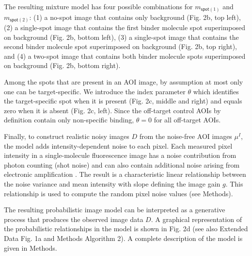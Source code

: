 The resulting mixture model has four possible combinations for $m_{\mathsf{spot}(1)}$ and $m_{\mathsf{spot}(2)}$: (1) a no-spot image that contains only background (Fig. 2b, top left), (2) a single-spot image that contains the first binder molecule spot superimposed on background (Fig. 2b, bottom left), (3) a single-spot image that contains the second binder molecule spot superimposed on background (Fig. 2b, top right), and (4) a two-spot image that contains both binder molecule spots superimposed on background (Fig. 2b, bottom right).

Among the spots that are present in an AOI image, by assumption at most only one can be target-specific. We introduce the index parameter $\theta$ which identifies the target-specific spot  when it is present (Fig. 2c, middle and right) and equals zero when it is absent (Fig. 2c, left). Since the off-target control AOIs by definition contain only non-specific binding, $\theta = 0$ for all off-target AOIs. 

Finally, to construct realistic noisy images $D$ from the noise-free AOI images $\mu^I$, the model adds intensity-dependent noise to each pixel.  Each measured pixel intensity in a single-molecule fluorescence image has a noise contribution from photon counting (shot noise) and can also contain additional noise arising from electronic amplification \cite{Van_Vliet1998-jk}. The result is a characteristic linear relationship between the noise variance and mean intensity with slope defining the image gain $g$. This relationship is used to compute the random pixel noise values (see Methods).

The resulting probabilistic image model can be interpreted as a generative process that produces the observed image data $D$. A graphical representation of the probabilistic relationships in the model is shown in Fig. 2d (see also Extended Data Fig. 1a and Methods Algorithm 2). A complete description of the model is given in Methods.  

